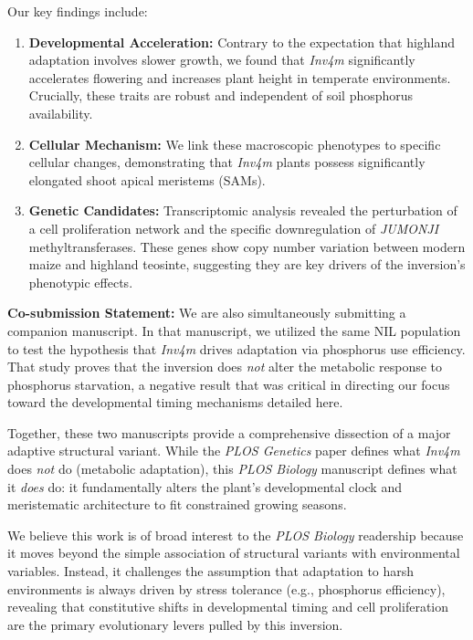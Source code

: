 \documentclass[11pt]{article}
\begin{document}
Our key findings include:
\begin{enumerate}[leftmargin=*, label=\textbf{\arabic*.}]
    \item \textbf{Developmental Acceleration:} Contrary to the expectation that highland adaptation involves slower growth, we found that \textit{Inv4m} significantly accelerates flowering and increases plant height in temperate environments. Crucially, these traits are robust and independent of soil phosphorus availability.
    
    \item \textbf{Cellular Mechanism:} We link these macroscopic phenotypes to specific cellular changes, demonstrating that \textit{Inv4m} plants possess significantly elongated shoot apical meristems (SAMs).
    
    \item \textbf{Genetic Candidates:} Transcriptomic analysis revealed the perturbation of a cell proliferation network and the specific downregulation of \textit{JUMONJI} methyltransferases. These genes show copy number variation between modern maize and highland teosinte, suggesting they are key drivers of the inversion's phenotypic effects.
\end{enumerate}

\textbf{Co-submission Statement:}
We are also simultaneously submitting a companion manuscript. In that manuscript, we utilized the same NIL population to test the hypothesis that \textit{Inv4m} drives adaptation via phosphorus use efficiency. That study proves that the inversion does \textit{not} alter the metabolic response to phosphorus starvation, a negative result that was critical in directing our focus toward the developmental timing mechanisms detailed here. 

Together, these two manuscripts provide a comprehensive dissection of a major adaptive structural variant. While the \textit{PLOS Genetics} paper defines what \textit{Inv4m} does \textit{not} do (metabolic adaptation), this \textit{PLOS Biology} manuscript defines what it \textit{does} do: it fundamentally alters the plant's developmental clock and meristematic architecture to fit constrained growing seasons.

We believe this work is of broad interest to the \textit{PLOS Biology} readership because it moves beyond the simple association of structural variants with environmental variables. Instead, it challenges the assumption that adaptation to harsh environments is always driven by stress tolerance (e.g., phosphorus efficiency), revealing that constitutive shifts in developmental timing and cell proliferation are the primary evolutionary levers pulled by this inversion.
\end{document}

